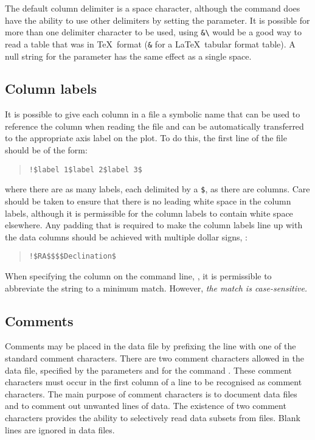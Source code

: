 The default column delimiter is a space character, although the
 command does have the ability to use other
delimiters by setting the  parameter.  It is possible for
more than one delimiter character to be used, \eg using \verb+&\+
would be a good way to read a table that was in \TeX\ format (\verb+&+
for a \LaTeX\ tabular format table).  A null string for the
 parameter has the same effect as a single space.


\subsection{Column labels}

It is possible to give each column in a file a symbolic name that can be used
to reference the column when reading the file and can be automatically
transferred to the appropriate axis label on the plot.
To do this, the first line of the file should be of the form:
\begin{quote}
\begin{verbatim}
!$label 1$label 2$label 3$
\end{verbatim}
\end{quote}
where there are as many labels, each delimited by a \verb+$+, as there are
columns.
Care should be taken to ensure that there is no leading white space in the
column labels, although it is permissible for the column labels to contain
white space elsewhere.
Any padding that is required to make the column labels line up with the data
columns should be achieved with multiple dollar signs,
\eg:
\begin{quote}
\begin{verbatim}
!$RA$$$$Declination$
\end{verbatim}
\end{quote}
When specifying the column on the command line, \eg {},
it is permissible to abbreviate the string to a minimum match.
However, {\em the match is case-sensitive.}


\subsection{Comments}

Comments may be placed in the data file by prefixing the line with one
of the standard comment characters.  There are two comment characters
allowed in the data file, specified by the parameters 
and  for the command .  These comment
characters must occur in the first column of a line to be recognised
as comment characters.  The main purpose of comment characters is to
document data files and to comment out unwanted lines of data.  The
existence of two comment characters provides the ability to
selectively read data subsets from files.  Blank lines are ignored in
data files.

